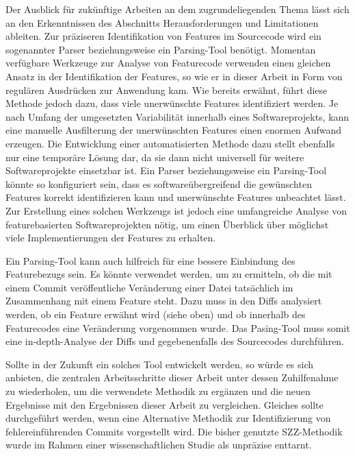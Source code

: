 Der Ausblick für zukünftige Arbeiten an dem zugrundeliegenden Thema lässt sich an den Erkenntnissen des Abschnitts \glqq Herausforderungen und Limitationen\grqq{} ableiten.
Zur präziseren Identifikation von Features im Sourcecode wird ein sogenannter \glqq Parser\grqq{} beziehungsweise ein \glqq Parsing-Tool\grqq{} benötigt. Momentan verfügbare Werkzeuge zur Analyse von Featurecode verwenden einen gleichen Ansatz in der Identifikation der Features, so wie er in dieser Arbeit in Form von regulären Ausdrücken zur Anwendung kam. Wie bereits erwähnt, führt diese Methode jedoch dazu, dass viele unerwünschte Features identifiziert werden. Je nach Umfang der umgesetzten Variabilität innerhalb eines Softwareprojekts, kann eine manuelle Ausfilterung der unerwünschten Features einen enormen Aufwand erzeugen. Die Entwicklung einer automatisierten Methode dazu stellt ebenfalls nur eine temporäre Lösung dar, da sie dann nicht universell für weitere Softwareprojekte einsetzbar ist. Ein Parser beziehungsweise ein Parsing-Tool könnte so konfiguriert sein, dass es softwareübergreifend die gewünschten Features korrekt identifizieren kann und unerwünschte Features unbeachtet lässt. Zur Erstellung eines solchen Werkzeugs ist jedoch eine umfangreiche Analyse von featurebasierten Softwareprojekten nötig, um einen Überblick über möglichst viele Implementierungen der Features zu erhalten.

Ein Parsing-Tool kann auch hilfreich für eine bessere Einbindung des Featurebezugs sein. Es könnte verwendet werden, um zu ermitteln, ob die mit einem Commit veröffentliche Veränderung einer Datei tatsächlich im Zusammenhang mit einem Feature steht. Dazu muss in den Diffs analysiert werden, ob ein Feature erwähnt wird (siehe oben) und ob innerhalb des Featurecodes eine Veränderung vorgenommen wurde. Das Pasing-Tool muss somit eine \glqq in-depth\grqq -Analyse der Diffs und gegebenenfalls des Sourcecodes durchführen.

Sollte in der Zukunft ein solches Tool entwickelt werden, so würde es sich anbieten, die zentralen Arbeitsschritte dieser Arbeit unter dessen Zuhilfenahme zu wiederholen, um die verwendete Methodik zu ergänzen und die neuen Ergebnisse mit den Ergebnissen dieser Arbeit zu vergleichen. Gleiches sollte durchgeführt werden, wenn eine Alternative Methodik zur Identifizierung von fehlereinführenden Commits vorgestellt wird. Die bisher genutzte SZZ-Methodik wurde im Rahmen einer wissenschaftlichen Studie als unpräzise \glqq enttarnt\grqq.

\cleardoublepage